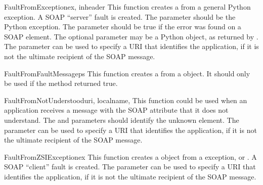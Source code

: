 \begin{funcdesc}{FaultFromException}{ex, inheader}
This function creates a  from a general Python exception.
A SOAP ``server'' fault is created.
The  parameter should be the Python exception.
The  parameter should be true if the error was
found on a SOAP  element.
The optional  parameter may be a Python 
object, as returned by .
The  parameter can be used to specify a URI that identifies the
application, if it is not the ultimate recipient of the SOAP message.
\end{funcdesc}

\begin{funcdesc}{FaultFromFaultMessage}{ps}
This function creates a  from a  object.
It should only be used if the  method returned true.
\end{funcdesc}

\begin{funcdesc}{FaultFromNotUnderstood}{uri, localname,}
This function could be used when an application receives a message with
the SOAP  attribute that it does not understand.
The  and  parameters should identify
the unknown element.
The  parameter can be used to specify a URI that identifies the
application, if it is not the ultimate recipient of the SOAP message.
\end{funcdesc}

\begin{funcdesc}{FaultFromZSIException}{ex}
This function creates a  object from a \ZSI{} exception,
 or .
A SOAP ``client'' fault is created.
The  parameter can be used to specify a URI that identifies the
application, if it is not the ultimate recipient of the SOAP message.
\end{funcdesc}

